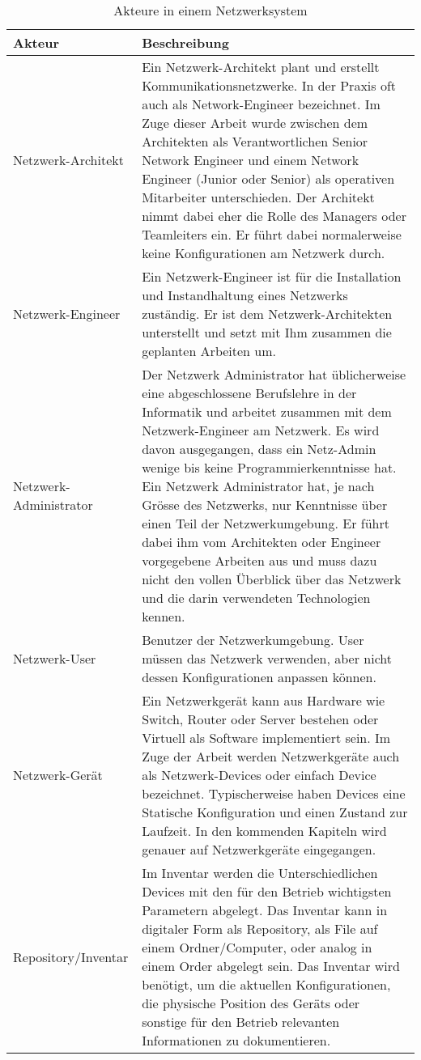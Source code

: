 \documentclass[
	ngerman,
	toc=listof, %
	toc=bibliography, %
	footnotes=multiple, %
	parskip=half, %
	numbers=noendperiod %
]{scrartcl}
\begin{document}
	\begin{table}[!h]
		\begin{tabularx}{\textwidth}{lX}
			\toprule
			Akteur &  Beschreibung \\
			\midrule
			Netzwerk-Architekt  & Ein Netzwerk-Architekt plant und erstellt Kommunikationsnetzwerke. 
			In der Praxis oft auch als Network-Engineer bezeichnet. 
			Im Zuge dieser Arbeit wurde zwischen dem Architekten als Verantwortlichen Senior Network Engineer und einem Network Engineer (Junior oder Senior) als operativen Mitarbeiter unterschieden. 
			Der Architekt nimmt dabei eher die Rolle des Managers oder Teamleiters ein. Er führt dabei normalerweise keine Konfigurationen am Netzwerk durch. \\ 
			Netzwerk-Engineer  & Ein Netzwerk-Engineer ist für die Installation und Instandhaltung eines Netzwerks zuständig. 
			Er ist dem Netzwerk-Architekten unterstellt und setzt mit Ihm zusammen die geplanten Arbeiten um. \\
			Netzwerk-Administrator  & Der Netzwerk Administrator hat üblicherweise eine abgeschlossene Berufslehre in der Informatik und arbeitet zusammen mit dem Netzwerk-Engineer am Netzwerk. 
			Es wird davon ausgegangen, dass ein Netz-Admin wenige bis keine Programmierkenntnisse hat. 
			Ein Netzwerk Administrator hat, je nach Grösse des Netzwerks, nur Kenntnisse über einen Teil der Netzwerkumgebung. 
			Er führt dabei ihm vom Architekten oder Engineer vorgegebene Arbeiten aus und muss dazu nicht den vollen Überblick über das Netzwerk und die darin verwendeten Technologien kennen.\\
			Netzwerk-User & Benutzer der Netzwerkumgebung. User müssen das Netzwerk verwenden, aber nicht dessen Konfigurationen anpassen können. \\
			\midrule
			Netzwerk-Gerät  & Ein Netzwerkgerät kann aus Hardware wie Switch, Router oder Server bestehen oder Virtuell als Software implementiert sein. Im Zuge der Arbeit werden Netzwerkgeräte auch als Netzwerk-Devices oder einfach Device bezeichnet. Typischerweise haben Devices eine Statische Konfiguration und einen Zustand zur Laufzeit. In den kommenden Kapiteln wird genauer auf Netzwerkgeräte eingegangen. \\
			Repository/Inventar &  Im Inventar werden die Unterschiedlichen Devices mit den für den Betrieb wichtigsten Parametern abgelegt. Das Inventar kann in digitaler Form als Repository, als File auf einem Ordner/Computer, oder analog in einem Order abgelegt sein. Das Inventar wird benötigt, um die aktuellen Konfigurationen, die physische Position des Geräts oder sonstige für den Betrieb relevanten Informationen zu dokumentieren. \\
			\bottomrule
		\end{tabularx}
			\caption{Akteure in einem Netzwerksystem}
	\end{table}
	
\end{document}

